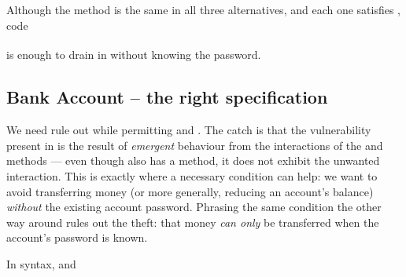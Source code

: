 Although the  method is the same in
all three alternatives, and each one satisfies \Sclassic,
code 
\\ 
$\ \strut \hspace{.2in} $ 
\\ 
is enough to drain   in \ModB without knowing the password.


 \subsection{Bank Account -- the right specification}
\label{s:bankSpecEx}

We need  rule out \ModB while permitting \ModA and
\ModC. The catch is that the vulnerability present in \ModB is the result
of  \emph{emergent} behaviour from the interactions of the 
and  methods --- even though \ModC also has a
 method, it does not exhibit the unwanted interaction.
This is exactly where a necessary condition can help:
we want to avoid transferring money
(or more generally, reducing an account's balance)
\textit{without} the existing account password.  Phrasing the same condition
the other way around %
rules out the theft: that money \textit{can only} be
transferred when the account's password is known.


In \Nec  syntax, and 
 

